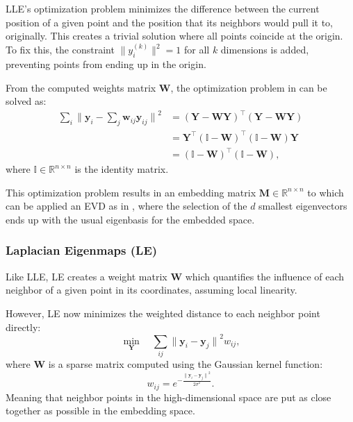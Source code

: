             \ac{LLE}'s optimization problem minimizes the difference between the current position of a given point and the position that its neighbors would pull it to, originally. This creates a trivial solution where all points coincide at the origin. To fix this, the constraint $ \| y_i^{(k)} \|^2 = 1$ for all $k$ dimensions is added, preventing points from ending up in the origin.

            From the computed weights matrix $\boldsymbol{W}$, the optimization problem in  can be solved as:
            \begin{align}
                \sum_i {\| \boldsymbol{y}_i - \sum_j \boldsymbol{w}_{ij} \boldsymbol{y}_{ij} \|}^2
                    &= (\boldsymbol{Y}- \boldsymbol{WY})^\top(\boldsymbol{Y}- \boldsymbol{WY}) \\
                    &= \boldsymbol{Y}^\top (\boldsymbol{\mathbb{I}} - \boldsymbol{W})^\top(\boldsymbol{\mathbb{I}} - \boldsymbol{W}) \boldsymbol{Y} \\
                    &= (\boldsymbol{\mathbb{I}} - \boldsymbol{W})^\top(\boldsymbol{\mathbb{I}} - \boldsymbol{W}),
            \end{align}
            where $\boldsymbol{\mathbb{I}}\in\mathbb{R}^{n\times n}$ is the identity matrix.

            This optimization problem results in an embedding matrix $\boldsymbol{M} \in \mathbb{R}^{n\times n}$ to which can be applied an \ac{EVD} as in , where the selection of the $d$ smallest eigenvectors ends up with the usual eigenbasis for the embedded space.

        \subsubsection{Laplacian Eigenmaps (LE)}
            Like \ac{LLE}, \ac{LE} \cite{le} creates a weight matrix $\boldsymbol{W}$ which quantifies the influence of each neighbor of a given point in its coordinates, assuming local linearity.

            However, \ac{LE} now minimizes the weighted distance to each neighbor point directly:
            \begin{equation}
                \min_{\boldsymbol{Y}} \quad \sum_{ij} {\| \boldsymbol{y}_i - \boldsymbol{y}_j \|}^2 w_{ij},
            \end{equation}
            where $\boldsymbol{W}$ is a sparse matrix computed using the Gaussian kernel function:
            \begin{equation}
                w_{ij} = e^{-\frac{{\| \boldsymbol{y}_i - \boldsymbol{y}_j \|}^2}{2\sigma^2}}.
            \end{equation}
            Meaning that neighbor points in the high-dimensional space are put as close together as possible in the embedding space.
            
